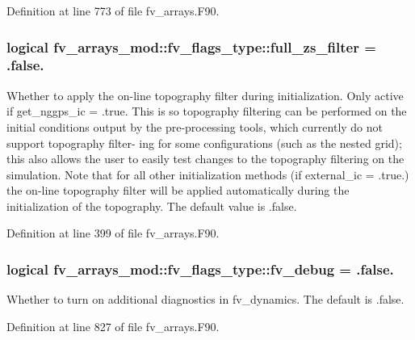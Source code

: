 Definition at line 773 of file fv\-\_\-arrays.\-F90.

\subsubsection[{full\-\_\-zs\-\_\-filter}]{\setlength{\rightskip}{0pt plus 5cm}logical fv\-\_\-arrays\-\_\-mod\-::fv\-\_\-flags\-\_\-type\-::full\-\_\-zs\-\_\-filter = .false.}\label{structfv__arrays__mod_1_1fv__flags__type_afbe4a46c5b9ecf80644125620d3bf57d}


Whether to apply the on-\/line topography filter during initialization. Only active if get\-\_\-nggps\-\_\-ic = .true. This is so topography filtering can be performed on the initial conditions output by the pre-\/processing tools, which currently do not support topography filter-\/ ing for some configurations (such as the nested grid); this also allows the user to easily test changes to the topography filtering on the simulation. Note that for all other initialization methods (if external\-\_\-ic = .true.) the on-\/line topography filter will be applied automatically during the initialization of the topography. The default value is .false. 



Definition at line 399 of file fv\-\_\-arrays.\-F90.

\subsubsection[{fv\-\_\-debug}]{\setlength{\rightskip}{0pt plus 5cm}logical fv\-\_\-arrays\-\_\-mod\-::fv\-\_\-flags\-\_\-type\-::fv\-\_\-debug = .false.}\label{structfv__arrays__mod_1_1fv__flags__type_aa4430a562824fe3ce7ea0834babe2c0b}


Whether to turn on additional diagnostics in fv\-\_\-dynamics. The default is .false. 



Definition at line 827 of file fv\-\_\-arrays.\-F90.

